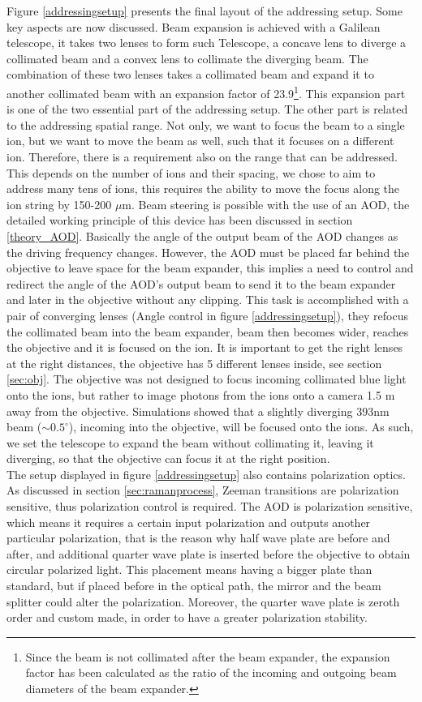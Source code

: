 Figure \ref{addressingsetup} presents the final layout of the addressing setup. Some key aspects are now discussed. Beam expansion is achieved with a Galilean telescope, it takes two lenses to form such Telescope, a concave lens to diverge a collimated beam and a convex lens to collimate the diverging beam. The combination of these two lenses takes a collimated beam and expand it to another collimated beam with an expansion factor of 23.9\footnote{Since the beam is not collimated after the beam expander, the expansion factor has been calculated as the ratio of the incoming and outgoing beam diameters of the beam expander.}. This expansion part is one of the two essential part of the addressing setup. The other part is related to the addressing spatial range. Not only, we want to focus the beam to a single ion, but we want to move the beam as well, such that it focuses on a different ion. Therefore, there is a requirement also on the range that can be addressed. This depends on the number of ions and their spacing, we chose to aim to address many tens of ions, this requires the ability to move the focus along the ion string by 150-200 $\mu$m. Beam steering is possible with the use of an AOD, the detailed working principle of this device has been discussed in section \ref{theory_AOD}. Basically the angle of the output beam of the AOD changes as the driving frequency changes. However, the AOD must be placed far behind the objective to leave space for the beam expander, this implies a need to control and redirect the angle of the AOD's output beam to send it to the beam expander and later in the objective without any clipping. This task is accomplished with a pair of converging lenses (Angle control in figure \ref{addressingsetup}), they refocus the collimated beam into the beam expander, beam then becomes wider, reaches the objective and it is focused on the ion. It is important to get the right lenses at the right distances, the objective has 5 different lenses inside, see section \ref{sec:obj}. The objective was not designed to focus incoming collimated blue light onto the ions, but rather to image photons from the ions onto a camera 1.5 m away from the objective. Simulations showed that a slightly diverging 393nm beam ($\sim 0.5^\circ$), incoming into the objective, will be focused onto the ions. As such, we set the telescope to expand the beam without collimating it, leaving it diverging, so that the objective can focus it at the right position.\\
The setup displayed in figure \ref{addressingsetup} also contains polarization optics. As discussed in section \ref{sec:ramanprocess}, Zeeman transitions are polarization sensitive, thus polarization control is required. The AOD is polarization sensitive, which means it requires a certain input polarization and outputs another particular polarization, that is the reason why half wave plate are before and after, and additional quarter wave plate is inserted before the objective to obtain circular polarized light. This placement means having a bigger plate than standard, but if placed before in the optical path, the mirror and the beam splitter could alter the polarization. Moreover, the quarter wave plate is zeroth order and custom made, in order to have a greater polarization stability.\\
